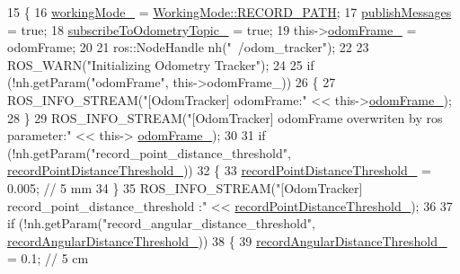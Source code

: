 \begin{DoxyCode}
15 \{
16     \hyperlink{classcl__move__base__z_1_1odom__tracker_1_1OdomTracker_a5ae598c85c4469f4c0e984480575c42b}{workingMode\_} = \hyperlink{namespacecl__move__base__z_1_1odom__tracker_ac46b05813b2791604f6cd0a39ace3ef8a023bc3adf68871ef7a0c616765ac80a7}{WorkingMode::RECORD\_PATH};
17     \hyperlink{classcl__move__base__z_1_1odom__tracker_1_1OdomTracker_a4f253d45ab5750dee3c2f18dd5599725}{publishMessages} = \textcolor{keyword}{true};
18     \hyperlink{classcl__move__base__z_1_1odom__tracker_1_1OdomTracker_afbe614b53a1493eb8268b8ea65b5b93a}{subscribeToOdometryTopic\_} = \textcolor{keyword}{true};
19     this->\hyperlink{classcl__move__base__z_1_1odom__tracker_1_1OdomTracker_a54f31af5e74006560d94f266297853d4}{odomFrame\_} = odomFrame;
20 
21     ros::NodeHandle nh(\textcolor{stringliteral}{"~/odom\_tracker"});
22 
23     ROS\_WARN(\textcolor{stringliteral}{"Initializing Odometry Tracker"});
24 
25     \textcolor{keywordflow}{if} (!nh.getParam(\textcolor{stringliteral}{"odomFrame"}, this->odomFrame\_))
26     \{
27         ROS\_INFO\_STREAM(\textcolor{stringliteral}{"[OdomTracker] odomFrame:"} << this->\hyperlink{classcl__move__base__z_1_1odom__tracker_1_1OdomTracker_a54f31af5e74006560d94f266297853d4}{odomFrame\_});
28     \}
29     ROS\_INFO\_STREAM(\textcolor{stringliteral}{"[OdomTracker] odomFrame overwriten by ros parameter:"} << this->
      \hyperlink{classcl__move__base__z_1_1odom__tracker_1_1OdomTracker_a54f31af5e74006560d94f266297853d4}{odomFrame\_});
30 
31     \textcolor{keywordflow}{if} (!nh.getParam(\textcolor{stringliteral}{"record\_point\_distance\_threshold"}, 
      \hyperlink{classcl__move__base__z_1_1odom__tracker_1_1OdomTracker_a3a1173716d527bd182d04656491e01dd}{recordPointDistanceThreshold\_}))
32     \{
33         \hyperlink{classcl__move__base__z_1_1odom__tracker_1_1OdomTracker_a3a1173716d527bd182d04656491e01dd}{recordPointDistanceThreshold\_} = 0.005; \textcolor{comment}{// 5 mm}
34     \}
35     ROS\_INFO\_STREAM(\textcolor{stringliteral}{"[OdomTracker] record\_point\_distance\_threshold :"} << 
      \hyperlink{classcl__move__base__z_1_1odom__tracker_1_1OdomTracker_a3a1173716d527bd182d04656491e01dd}{recordPointDistanceThreshold\_});
36 
37     \textcolor{keywordflow}{if} (!nh.getParam(\textcolor{stringliteral}{"record\_angular\_distance\_threshold"}, 
      \hyperlink{classcl__move__base__z_1_1odom__tracker_1_1OdomTracker_a1274fe5334c109cd9c2339beb9411441}{recordAngularDistanceThreshold\_}))
38     \{
39         \hyperlink{classcl__move__base__z_1_1odom__tracker_1_1OdomTracker_a1274fe5334c109cd9c2339beb9411441}{recordAngularDistanceThreshold\_} = 0.1; \textcolor{comment}{// 5 cm}

\end{DoxyCode}
